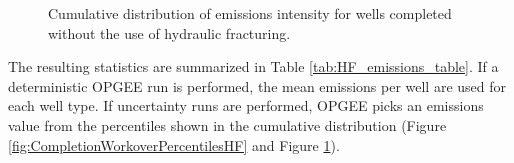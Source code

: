 \documentclass[11pt]{report}
\begin{document}
{{{{\begin{figure}[tb]
\begin{center}
\hfill
{}
\hfill
\caption{Cumulative distribution of emissions intensity for wells completed without the use of hydraulic fracturing.}
\label{fig:CompletionWorkoverPercentilesNHF}
\end{center}
\end{figure}

The resulting statistics are summarized in Table \ref{tab:HF_emissions_table}. If a deterministic OPGEE run is performed, the mean emissions per well are used for each well type. If uncertainty runs are performed, OPGEE picks an emissions value from the percentiles shown in the cumulative distribution (Figure \ref{fig:CompletionWorkoverPercentilesHF} and Figure \ref{fig:CompletionWorkoverPercentilesNHF}).

}}}}
\end{document}
